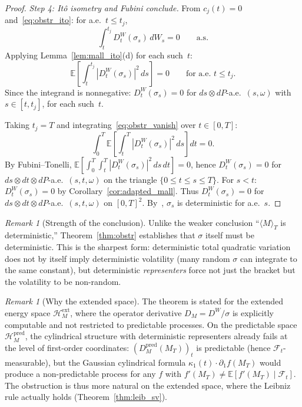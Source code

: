 \documentclass[11pt,a4paper]{article}
\theoremstyle{plain}
\theoremstyle{definition}
\theoremstyle{remark}
\newtheorem{remark}[theorem]{Remark}
\newcommand{\E}{\mathbb{E}}
\newcommand{\HM}{\mathcal{H}_M}
\begin{document}
\begin{proof}
\emph{Step 4: It\^o isometry and Fubini conclude.} From $c_j(t) = 0$ and~\eqref{eq:obstr_ito}: for a.e.\ $t \le t_j$,
\[
\int_t^{t_j} D_t^W(\sigma_s)\,dW_s = 0 \qquad \text{a.s.}
\]
Applying Lemma~\ref{lem:mall_ito}(d) for each such~$t$:
\begin{equation}\label{eq:obstr_vanish}
\E\!\left[\int_t^{t_j} |D_t^W(\sigma_s)|^2\,ds\right] = 0 \qquad \text{for a.e.\ } t \le t_j.
\end{equation}
Since the integrand is nonneg\-ative: $D_t^W(\sigma_s) = 0$ for $ds\otimes dP$-a.e.\ $(s,\omega)$ with $s \in [t, t_j]$, for each such~$t$.

Taking $t_j = T$ and integrating~\eqref{eq:obstr_vanish} over $t \in [0,T]$:
\[
\int_0^T\E\!\left[\int_t^T |D_t^W(\sigma_s)|^2\,ds\right]dt = 0.
\]
By Fubini--Tonelli, $\E[\int_0^T\int_t^T |D_t^W(\sigma_s)|^2\,ds\,dt] = 0$, hence $D_t^W(\sigma_s) = 0$ for $ds\otimes dt\otimes dP$-a.e.\ $(s,t,\omega)$ on the triangle $\{0 \le t \le s \le T\}$. For $s < t$: $D_t^W(\sigma_s) = 0$ by Corollary~\ref{cor:adapted_mall}. Thus $D_t^W(\sigma_s) = 0$ for $ds\otimes dt\otimes dP$-a.e.\ $(s,t,\omega)$ on $[0,T]^2$. By~\cite[Proposition 1.2.1]{Nualart2006}, $\sigma_s$ is deterministic for a.e.~$s$.
\end{proof}

\begin{remark}[Strength of the conclusion]\label{rem:obstr_strength}
Unlike the weaker conclusion ``$\langle M\rangle_T$ is deterministic,'' Theorem~\ref{thm:obstr} establishes that $\sigma$ itself must be deterministic. This is the sharpest form: deterministic total quadratic variation does not by itself imply deterministic volatility (many random $\sigma$ can integrate to the same constant), but deterministic \emph{representers} force not just the bracket but the volatility to be non-random.
\end{remark}

\begin{remark}[Why the extended space]\label{rem:obstr_extended}
The theorem is stated for the extended energy space $\HM^{\mathrm{ext}}$, where the operator derivative $D_M = D^W/\sigma$ is explicitly computable and not restricted to predictable processes. On the predictable space $\HM^{\mathrm{pred}}$, the cylindrical structure with deterministic representers already fails at the level of first-order coordinates: $(D_M^{\mathrm{pred}}(M_T))_t$ is predictable (hence $\mathcal{F}_t$-measurable), but the Gaussian cylindrical formula $\kappa_1(t) \cdot \partial_1 f(M_T)$ would produce a non-predictable process for any $f$ with $f'(M_T) \neq \E[f'(M_T)\mid\mathcal{F}_t]$. The obstruction is thus more natural on the extended space, where the Leibniz rule actually holds (Theorem~\ref{thm:leib_sv}).
\end{remark}
\end{document}
